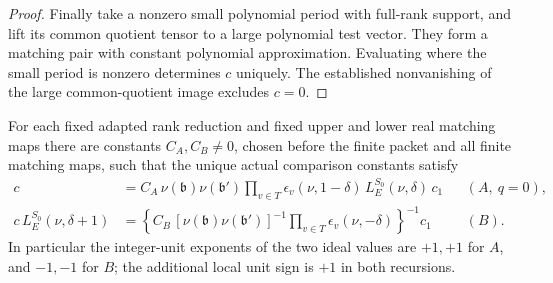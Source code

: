 \begin{proof}
Finally take a nonzero small polynomial period with full-rank
support, and lift its common quotient tensor to a large
polynomial test vector. They form a matching pair with
constant polynomial approximation. Evaluating where the
small period is nonzero determines \(c\) uniquely.
The established nonvanishing of the large common-quotient
image excludes \(c=0\).
\end{proof}

\begin{srproposition}
\label{prop:sr-theta-actual-StepAlphaBeta}
For each fixed adapted rank reduction and fixed upper and
lower real matching maps there are constants \(C_A,C_B\ne0\),
chosen before the finite packet and all finite matching maps,
such that the unique actual comparison constants satisfy
\[
 \begin{split}
 c&= C_A\,
       \nu(\mathfrak b)\nu(\mathfrak b')
       \prod_{v\in T}\epsilon_v(\nu,1-\delta)\,
       L_E^{S_0}(\nu,\delta)\,c_1
                     &&(A,\ q=0),\\
 c\,L_E^{S_0}(\nu,\delta+1)
    &=\left\{C_B\,
       [\nu(\mathfrak b)\nu(\mathfrak b')]^{-1}
       \prod_{v\in T}\epsilon_v(\nu,-\delta)
      \right\}^{-1}c_1
                     &&(B).
 \end{split}                                      \tag{E8}
 \label{eq:sr-theta-actual-recursions}
\]
In particular the integer-unit exponents of the two ideal
values are \(+1,+1\) for \(A\), and \(-1,-1\) for \(B\);
the additional local unit sign is \(+1\) in both recursions.
\end{srproposition}

